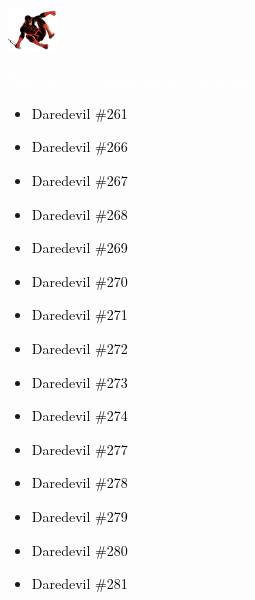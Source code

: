 \documentclass[12pt]{article}
\newcommand{\checkbox}{\raisebox{0.0ex}{\fbox{\rule{0ex}{1.5ex} \rule{1.5ex}{0ex}}}}
\begin{document}
\begin{center}
    \vspace*{2cm}
    \includegraphics[width=0.1\textwidth]{daredevil1.png}
    \vspace{0.3cm}

    {\Huge \textbf{\textcolor{white}{Daredevil Chronological Checklist}}}
\end{center}

\vspace{0.3cm}
\noindent
\begin{tcolorbox}[
  colback=white!95!gray,
  colframe=black,
  width=\textwidth,
  arc=4mm,
  auto outer arc,
  boxrule=0.8pt,
  left=8pt,right=8pt,top=8pt,bottom=8pt
]
\begin{itemize}[left=0pt,label={\checkbox}]
    \item \textcolor{black}{Daredevil \#261}
    \item \textcolor{black}{Daredevil \#266}
    \item \textcolor{black}{Daredevil \#267}
    \item \textcolor{black}{Daredevil \#268}
    \item \textcolor{black}{Daredevil \#269}
    \item \textcolor{black}{Daredevil \#270}
    \item \textcolor{black}{Daredevil \#271}
    \item \textcolor{black}{Daredevil \#272}
    \item \textcolor{black}{Daredevil \#273}
    \item \textcolor{black}{Daredevil \#274}
    \item \textcolor{black}{Daredevil \#277}
    \item \textcolor{black}{Daredevil \#278}
    \item \textcolor{black}{Daredevil \#279}
    \item \textcolor{black}{Daredevil \#280}
    \item \textcolor{black}{Daredevil \#281}
\end{itemize}
\end{tcolorbox}

\newpage
{}
\end{document}
